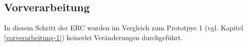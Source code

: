 \subsection{Vorverarbeitung} \label{vorverarbeitung-4}

In diesem Schritt der ERC wurden im Vergleich zum Prototpye 1 (vgl. Kapitel \ref{vorverarbeitung-1}) keinerlei Veränderungen durchgeführt. \\
